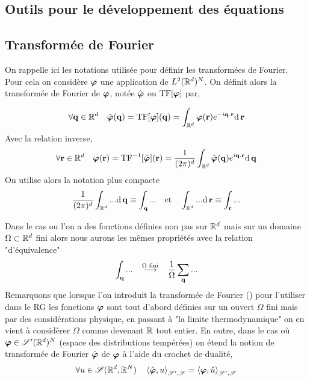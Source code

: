 \documentclass[10pt]{article}
\begin{document}
\pagebreak

\appendix


\begin{multicols}{2}
\section{Outils pour le développement des équations}

\label{ann:outils}

\subsection{Transformée de Fourier}

On rappelle ici les notations utilisée pour définir les transformées de Fourier. Pour cela on considère $\boldsymbol{ \varphi}$ une application de $L^2(\mathbb{R}^d)^N$. On définit alors la transformée de Fourier de $\boldsymbol{ \varphi}$, notée $\hat{\boldsymbol{ \varphi}}$ ou $\text{TF}[\boldsymbol{ \varphi}]$ par, 

\begin{equation}
  \forall {\bf q} \in \mathbb{R}^d \quad \hat{\boldsymbol{ \varphi}}({\bf q}) = \text{TF}[\boldsymbol{ \varphi}]({\bf q}) = \int_{\mathbb{R}^d} \boldsymbol{ \varphi}({\bf r}) e^{-i{\bf q}.{\bf r}}\text{d} \,{\bf r}
\end{equation}
Avec la relation inverse,
\begin{equation}
  \forall {\bf r} \in \mathbb{R}^d \quad \boldsymbol{ \varphi}({\bf r})  = \text{TF}^{-1}[\hat{\boldsymbol{ \varphi}}]({\bf r}) = \frac{1}{(2\pi)^d}\int_{\mathbb{R}^d} \hat{\boldsymbol{ \varphi}}({\bf q}) e^{i{\bf q}.{\bf r}}\text{d} \,{\bf q}
\end{equation}
On utilise alors la notation plus compacte 
\begin{equation}
  \frac{1}{(2\pi)^d}\int_{\mathbb{R}^d} ... \text{d} \,{\bf q} \equiv \int_{\bf q} ... \quad \text{et} \quad  \int_{\mathbb{R}^d} ... \text{d} \,{\bf r} \equiv \int_{\bf r} ... 
\end{equation}

Dans le cas ou l'on a des fonctions définies non pas sur $\mathbb{R}^d$ mais sur un domaine $\Omega \subset \mathbb{R}^d$ fini alors nous aurons les mêmes propriétés avec la relation "d'équivalence"  
\begin{equation}
	 \int_{{\bf q}} ... \overset{\text{$\Omega$ fini}}{\quad \longrightarrow \quad } \frac{1}{\Omega} \sum_{{\bf q}} ...
\end{equation}
Remarquons que lorsque l'on introduit la transformée de Fourier () pour l'utiliser dans le RG les fonctions $\boldsymbol{ \varphi}$ sont tout d'abord définies sur un ouvert $\Omega$ fini mais par des considérations physique, en passant à "la limite thermodynamique" on en vient à considèrer $\Omega$ comme devenant $\mathbb{R}$ tout entier. En outre, dans le cas où $\boldsymbol{ \varphi} \in \mathscr{S}'(\mathbb{R}^d)^N$ (espace des distributions tempérées) on étend la notion de transformée de Fourier $\hat{\boldsymbol{ \varphi}}$ de $\boldsymbol{ \varphi}$ à l'aide du crochet de dualité, 
\begin{equation}
  \forall u \in \mathscr{S}(\mathbb{R}^d, \mathbb{R}^N) \quad \left< \hat{\boldsymbol{ \varphi}}, u \right>_{\mathscr{S}', \mathscr{S}} = \left< \boldsymbol{ \varphi}, \hat{u} \right>_{\mathscr{S}', \mathscr{S}}
\end{equation}


\end{multicols}
\end{document}
